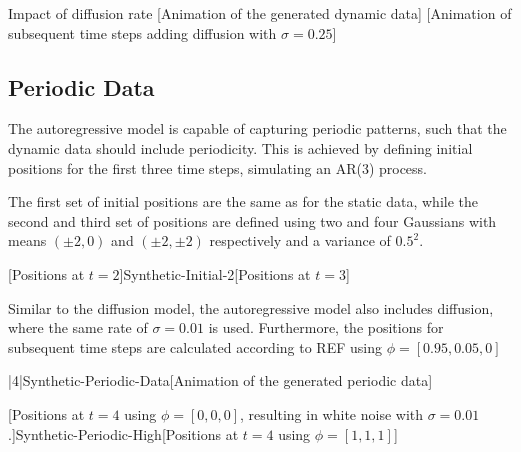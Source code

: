         
        Impact of diffusion rate
        [Animation of the generated dynamic data]
        [Animation of subsequent time steps adding diffusion with $\sigma=0.25$]
    
    \subsection{Periodic Data}
    
        The autoregressive model is capable of capturing periodic patterns, such that the dynamic data should include periodicity. This is achieved by defining initial positions for the first three time steps, simulating an AR(3) process. 
        
        The first set of initial positions are the same as for the static data, while the second and third set of positions are defined using two and four Gaussians with means $(\pm2,0)$ and $(\pm2,\pm2)$ respectively and a variance of $0.5^2$.
       
        [Positions at $t=2$]{Synthetic-Initial-2}[Positions at $t=3$]
        
        Similar to the diffusion model, the autoregressive model also includes diffusion, where the same rate of $\sigma=0.01$ is used. Furthermore, the positions for subsequent time steps are calculated according to REF using $\phi=[0.95, 0.05, 0]$
        
        
        
        \xanim|4|{Synthetic-Periodic-Data}[Animation of the generated periodic data]
        
        [Positions at $t=4$ using $\phi=[0,0,0]$, resulting in white noise with $\sigma=0.01$.]{Synthetic-Periodic-High}[Positions at $t=4$ using $\phi=[1,1,1]$]